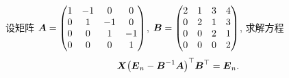 \begin{example}
    设矩阵 $\vb*{A}=\begin{pmatrix}
            1 & -1 & 0  & 0  \\
            0 & 1  & -1 & 0  \\
            0 & 0  & 1  & -1 \\
            0 & 0  & 0  & 1
        \end{pmatrix}$, $\vb*{B}=\begin{pmatrix}
            2 & 1 & 3 & 4 \\
            0 & 2 & 1 & 3 \\
            0 & 0 & 2 & 1 \\
            0 & 0 & 0 & 2
        \end{pmatrix}$, 求解方程
    $$\vb*{X}\qty(\vb*{E}_n-\vb*{B}^{-1}\vb*{A})^{\top}\vb*{B}^{\top}=\vb*{E}_n.$$
\end{example}
